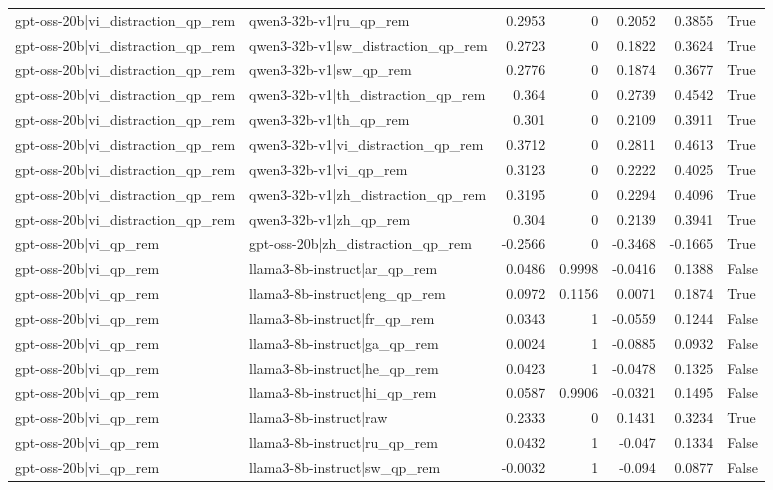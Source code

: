 \begin{table}
\begin{tabular}{l l r r r r l}
gpt-oss-20b|vi_distraction_qp_rem & qwen3-32b-v1|ru_qp_rem & 0.2953 & 0 & 0.2052 & 0.3855 & True \\
gpt-oss-20b|vi_distraction_qp_rem & qwen3-32b-v1|sw_distraction_qp_rem & 0.2723 & 0 & 0.1822 & 0.3624 & True \\
gpt-oss-20b|vi_distraction_qp_rem & qwen3-32b-v1|sw_qp_rem & 0.2776 & 0 & 0.1874 & 0.3677 & True \\
gpt-oss-20b|vi_distraction_qp_rem & qwen3-32b-v1|th_distraction_qp_rem & 0.364 & 0 & 0.2739 & 0.4542 & True \\
gpt-oss-20b|vi_distraction_qp_rem & qwen3-32b-v1|th_qp_rem & 0.301 & 0 & 0.2109 & 0.3911 & True \\
gpt-oss-20b|vi_distraction_qp_rem & qwen3-32b-v1|vi_distraction_qp_rem & 0.3712 & 0 & 0.2811 & 0.4613 & True \\
gpt-oss-20b|vi_distraction_qp_rem & qwen3-32b-v1|vi_qp_rem & 0.3123 & 0 & 0.2222 & 0.4025 & True \\
gpt-oss-20b|vi_distraction_qp_rem & qwen3-32b-v1|zh_distraction_qp_rem & 0.3195 & 0 & 0.2294 & 0.4096 & True \\
gpt-oss-20b|vi_distraction_qp_rem & qwen3-32b-v1|zh_qp_rem & 0.304 & 0 & 0.2139 & 0.3941 & True \\
gpt-oss-20b|vi_qp_rem & gpt-oss-20b|zh_distraction_qp_rem & -0.2566 & 0 & -0.3468 & -0.1665 & True \\
gpt-oss-20b|vi_qp_rem & llama3-8b-instruct|ar_qp_rem & 0.0486 & 0.9998 & -0.0416 & 0.1388 & False \\
gpt-oss-20b|vi_qp_rem & llama3-8b-instruct|eng_qp_rem & 0.0972 & 0.1156 & 0.0071 & 0.1874 & True \\
gpt-oss-20b|vi_qp_rem & llama3-8b-instruct|fr_qp_rem & 0.0343 & 1 & -0.0559 & 0.1244 & False \\
gpt-oss-20b|vi_qp_rem & llama3-8b-instruct|ga_qp_rem & 0.0024 & 1 & -0.0885 & 0.0932 & False \\
gpt-oss-20b|vi_qp_rem & llama3-8b-instruct|he_qp_rem & 0.0423 & 1 & -0.0478 & 0.1325 & False \\
gpt-oss-20b|vi_qp_rem & llama3-8b-instruct|hi_qp_rem & 0.0587 & 0.9906 & -0.0321 & 0.1495 & False \\
gpt-oss-20b|vi_qp_rem & llama3-8b-instruct|raw & 0.2333 & 0 & 0.1431 & 0.3234 & True \\
gpt-oss-20b|vi_qp_rem & llama3-8b-instruct|ru_qp_rem & 0.0432 & 1 & -0.047 & 0.1334 & False \\
gpt-oss-20b|vi_qp_rem & llama3-8b-instruct|sw_qp_rem & -0.0032 & 1 & -0.094 & 0.0877 & False \\

\end{tabular}
\end{table}

